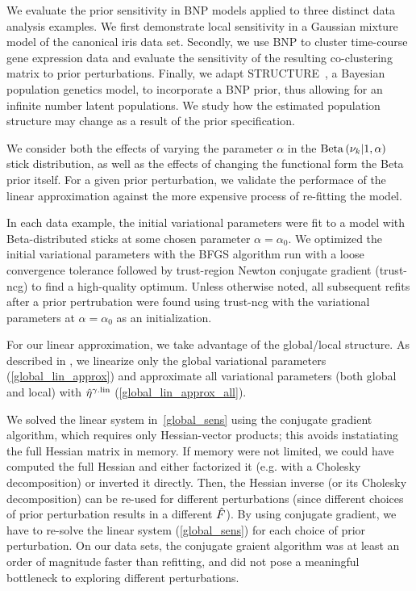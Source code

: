 We evaluate the prior sensitivity in BNP models applied to three distinct data analysis examples.
We first demonstrate local sensitivity in a Gaussian mixture model of the canonical iris data set.
Secondly, we use BNP to cluster time-course gene expression data
and evaluate the sensitivity of the resulting co-clustering matrix to prior perturbations.
Finally, we adapt STRUCTURE~\citep{pritchard:2000:structure}, a Bayesian population genetics model,
to incorporate a BNP prior, thus allowing for
an infinite number latent populations.
We study how the estimated population structure may change as a
result of the prior specification.

We consider both the effects of varying the parameter $\alpha$
in the $\mathrm{Beta}\left(\nu_{k} \vert 1, \alpha\right)$ stick distribution, as well as
the effects of changing the functional form the Beta prior itself.
For a given prior perturbation,
we validate the performace of the linear approximation against
the more expensive process of re-fitting the model.

In each data example,
the initial variational parameters were fit to a model
with Beta-distributed sticks at some chosen parameter $\alpha = \alpha_0$.
We optimized the initial variational parameters with
the BFGS algorithm run with a loose convergence tolerance
followed by trust-region Newton conjugate gradient (trust-ncg) to find a high-quality optimum.
Unless otherwise noted, all subsequent refits after a prior pertrubation were found
using trust-ncg with the variational parameters at $\alpha = \alpha_0$ as an initialization.

For our linear approximation,
we take advantage of the global/local structure.
As described in , we linearize only the
global variational parameters (\eqref{global_lin_approx}) and
approximate all variational parameters (both global and local)
with $\hat\eta^{\gamma.\mathrm{lin}}$ (\eqref{global_lin_approx_all}).

We solved the linear system in~\eqref{global_sens} using
the conjugate gradient algorithm, which requires only Hessian-vector products;
this avoids instatiating the full Hessian matrix in memory.
If memory were not limited,
we could have computed the full Hessian and
either factorized it (e.g. with a Cholesky decomposition) or inverted it directly.
Then, the Hessian inverse (or its Cholesky decomposition) can
be re-used for different perturbations
(since different choices of prior perturbation
results in a different $\hat F$).
By using conjugate gradient, we have to re-solve the linear system (\eqref{global_sens})
for each choice of prior perturbation.
On our data sets, the conjugate graient algorithm was at least
an order of magnitude faster than refitting, and did not pose a meaningful bottleneck
to exploring different perturbations.


